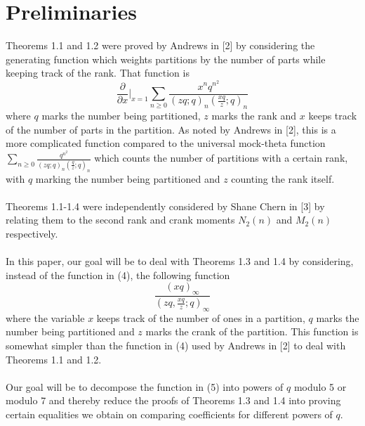\documentclass[10pt,reqno]{amsart}
\begin{document}
\section{Preliminaries}
Theorems 1.1 and 1.2 were proved by Andrews in [2] by considering the generating function which weights partitions by the number of parts while keeping track of the rank. That function is 
\begin{equation}
    \frac{\partial}{\partial x}\Bigr\rvert_{x = 1}\displaystyle\sum_{n\geq 0}\displaystyle\frac{x^nq^{n^2}}{(zq;q)_n(\displaystyle\frac{xq}{z};q)_n}
\end{equation}
where $q$ marks the number being partitioned, $z$ marks the rank and $x$ keeps track of the number of parts in the partition. As noted by Andrews in [2], this is a more complicated function compared to the universal mock-theta function $\displaystyle\sum_{n\geq 0}\displaystyle\frac{q^{n^2}}{(zq;q)_n(\displaystyle\frac{q}{z};q)_n}$ which counts the number of partitions with a certain rank, with $q$ marking the number being partitioned and $z$ counting the rank itself.\\ \\
Theorems 1.1-1.4 were independently considered by Shane Chern in [3] by relating them to the second rank and crank moments $N_2(n)$ and $M_2(n)$ respectively. \\ \\
In this paper, our goal will be to deal with Theorems 1.3 and 1.4 by considering, instead of the function in (4), the following function
\begin{equation}
    \displaystyle\frac{(xq)_{\infty}}{(zq,\displaystyle\frac{xq}{z};q)_{\infty}}
\end{equation}
where the variable $x$ keeps track of the number of ones in a partition, $q$ marks the number being partitioned and $z$ marks the crank of the partition. This function is somewhat simpler than the function in (4) used by Andrews in [2] to deal with Theorems 1.1 and 1.2. \\ \\
Our goal will be to decompose the function in (5) into powers of $q$ modulo 5 or modulo 7 and thereby reduce the proofs of Theorems 1.3 and 1.4 into proving certain equalities we obtain on comparing coefficients for different powers of $q.$
\end{document}
